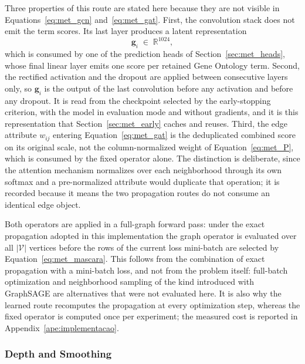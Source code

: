 \documentclass[Ingles]{ic-tese-v3}
\begin{document}
Three properties of this route are stated here because they are not visible in
Equations~\eqref{eq:met_gcn} and~\eqref{eq:met_gat}. First, the convolution stack does not emit the
term scores. Its last layer produces a latent representation
\begin{equation}
  \mathbf{g}_i \;\in\; \mathbb{R}^{1024},
  \label{eq:met_gnn_emb}
\end{equation}
\noindent which is consumed by one of the prediction heads of Section~\ref{sec:met_heads}, whose final linear
layer emits one score per retained Gene Ontology term. Second, the rectified activation and the
dropout are applied between consecutive layers only, so $\mathbf{g}_i$ is the output of the last
convolution before any activation and before any dropout. It is read from the checkpoint selected by
the early-stopping criterion, with the model in evaluation mode and without gradients, and it is
this
representation that Section~\ref{sec:met_early} caches and reuses. Third, the edge attribute
$w_{ij}$
entering
Equation~\eqref{eq:met_gat} is the deduplicated combined score on its original scale, not the
column-normalized weight of Equation~\eqref{eq:met_P}, which is consumed by the fixed operator
alone. The distinction is deliberate, since the attention mechanism normalizes over each
neighborhood through its own softmax and a pre-normalized attribute would duplicate that operation;
it is recorded because it means the two propagation routes do not consume an identical edge object.

Both operators are applied in a full-graph forward pass: under the exact propagation adopted in this
implementation the graph operator is evaluated over all $|\mathcal{V}|$ vertices before the rows of
the current loss mini-batch are selected by Equation~\eqref{eq:met_mascara}. This follows from the
combination of exact propagation with a mini-batch loss, and not from the problem itself:
full-batch optimization and neighborhood sampling of the kind introduced with GraphSAGE
\cite{hamilton2017graphsage} are alternatives that were not evaluated here. It is also why the
learned route recomputes the propagation at every optimization step, whereas the fixed operator is
computed once per experiment; the measured cost is reported in Appendix~\ref{ape:implementacao}.

\subsubsection{Depth and Smoothing}
\label{sec:met_contraste}
\end{document}
